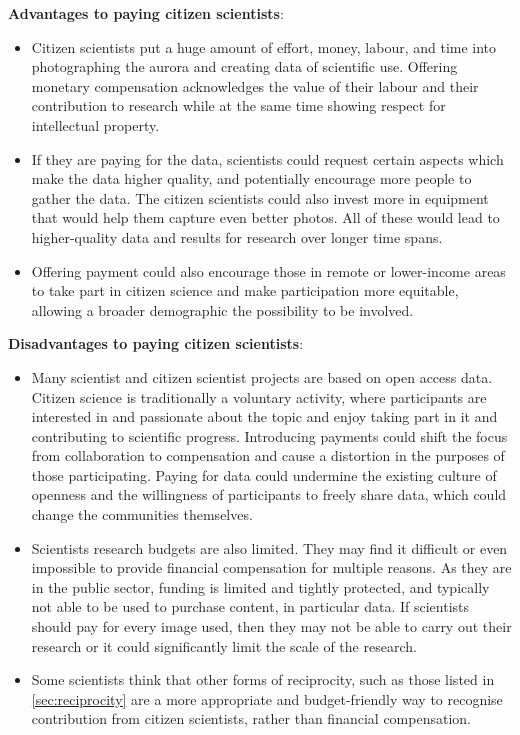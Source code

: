 \documentclass{article}
\begin{document}
\textbf{Advantages to paying citizen scientists}:
\begin{itemize}
    \item Citizen scientists put a huge amount of effort, money, labour, and time into photographing the aurora and creating data of scientific use. Offering monetary compensation acknowledges the value of their labour and their contribution to research while at the same time showing respect for intellectual property.
    \item If they are paying for the data, scientists could request certain aspects which make the data higher quality, and potentially encourage more people to gather the data. The citizen scientists could also invest more in equipment that would help them capture even better photos. All of these would lead to higher-quality data and results for research over longer time spans.
    \item Offering payment could also encourage those in remote or lower-income areas to take part in citizen science and make participation more equitable, allowing a broader demographic the possibility to be involved.
\end{itemize}

\textbf{Disadvantages to paying citizen scientists}:
\begin{itemize}
    \item Many scientist and citizen scientist projects are based on open access data. Citizen science is traditionally a voluntary activity, where participants are interested in and passionate about the topic and enjoy taking part in it and contributing to scientific progress. Introducing payments could shift the focus from collaboration to compensation and cause a distortion in the purposes of those participating. Paying for data could undermine the existing culture of openness and the willingness of participants to freely share data, which could change the communities themselves.
    \item Scientists research budgets are also limited. They may find it difficult or even impossible to provide financial compensation for multiple reasons. As they are in the public sector, funding is limited and tightly protected, and typically not able to be used to purchase content, in particular data. If scientists should pay for every image used, then they may not be able to carry out their research or it could significantly limit the scale of the research.
    \item Some scientists think that other forms of reciprocity, such as those listed in \ref{sec:reciprocity} are a more appropriate and budget-friendly way to recognise contribution from citizen scientists, rather than financial compensation.
\end{itemize}
\end{document}
